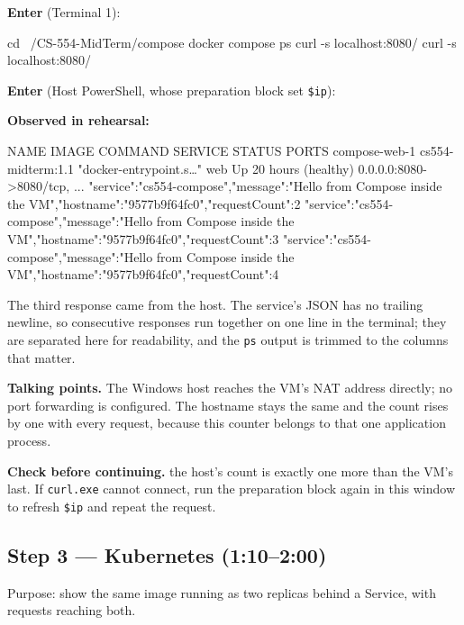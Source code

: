\documentclass[11pt,letterpaper]{article}
\newcommand{\code}[1]{\texttt{#1}}
\newcommand{\talk}[1]{\begin{shaded*}\noindent\textbf{Talking points.} #1\end{shaded*}}
\newcommand{\enter}[1]{\par\noindent\textbf{Enter} (#1):\par}
\newcommand{\observed}{\par\noindent\textbf{Observed in rehearsal:}\par}
\newcommand{\checkpoint}[1]{\par\noindent\textbf{Check before continuing.} #1\par}
\begin{document}
\enter{Terminal 1}
\begin{cmd}
cd ~/CS-554-MidTerm/compose
docker compose ps
curl -s localhost:8080/
curl -s localhost:8080/
\end{cmd}
\enter{Host PowerShell, whose preparation block set \code{\$ip}}
\observed
\begin{out}
NAME            IMAGE               COMMAND                  SERVICE   STATUS                  PORTS
compose-web-1   cs554-midterm:1.1   "docker-entrypoint.s…"   web       Up 20 hours (healthy)   0.0.0.0:8080->8080/tcp, ...
{"service":"cs554-compose","message":"Hello from Compose inside the VM","hostname":"9577b9f64fc0","requestCount":2}
{"service":"cs554-compose","message":"Hello from Compose inside the VM","hostname":"9577b9f64fc0","requestCount":3}
{"service":"cs554-compose","message":"Hello from Compose inside the VM","hostname":"9577b9f64fc0","requestCount":4}
\end{out}
The third response came from the host. The service's JSON has no trailing newline, so consecutive responses run together on one line in the terminal; they are separated here for readability, and the \code{ps} output is trimmed to the columns that matter.
\talk{The Windows host reaches the VM's NAT address directly; no port forwarding is configured. The hostname stays the same and the count rises by one with every request, because this counter belongs to that one application process.}
\checkpoint{the host's count is exactly one more than the VM's last. If \code{curl.exe} cannot connect, run the preparation block again in this window to refresh \code{\$ip} and repeat the request.}

\subsection*{Step 3 --- Kubernetes (1:10--2:00)}
Purpose: show the same image running as two replicas behind a Service, with requests reaching both.
\end{document}
